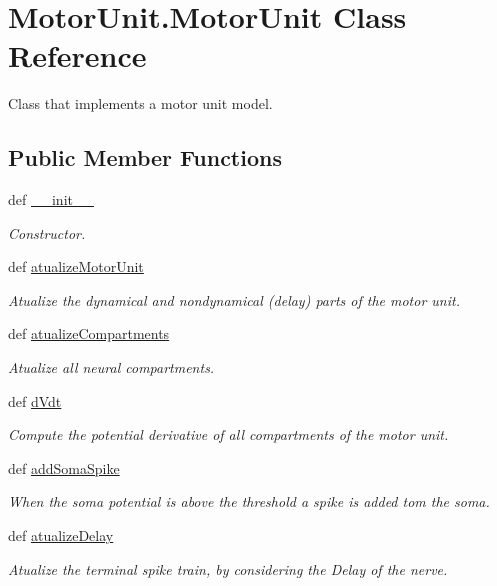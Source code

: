\hypertarget{class_motor_unit_1_1_motor_unit}{\section{Motor\-Unit.\-Motor\-Unit Class Reference}
\label{class_motor_unit_1_1_motor_unit}
}


Class that implements a motor unit model.  


\subsection*{Public Member Functions}
\begin{DoxyCompactItemize}
\item 
def \hyperlink{class_motor_unit_1_1_motor_unit_a5816d9af440be9c847293eff9c7a9f43}{\-\_\-\-\_\-init\-\_\-\-\_\-}
\begin{DoxyCompactList}\small\item\em Constructor. \end{DoxyCompactList}\item 
def \hyperlink{class_motor_unit_1_1_motor_unit_a1239418d3f8428a663ff99061710460f}{atualize\-Motor\-Unit}
\begin{DoxyCompactList}\small\item\em Atualize the dynamical and nondynamical (delay) parts of the motor unit. \end{DoxyCompactList}\item 
def \hyperlink{class_motor_unit_1_1_motor_unit_ae4093022b48cee82d78c99ecc24cb247}{atualize\-Compartments}
\begin{DoxyCompactList}\small\item\em Atualize all neural compartments. \end{DoxyCompactList}\item 
def \hyperlink{class_motor_unit_1_1_motor_unit_af694436ac5bd3194cfcbe42b8a60180d}{d\-Vdt}
\begin{DoxyCompactList}\small\item\em Compute the potential derivative of all compartments of the motor unit. \end{DoxyCompactList}\item 
def \hyperlink{class_motor_unit_1_1_motor_unit_accb8b6700ed06e1396b70af62a9f31c6}{add\-Soma\-Spike}
\begin{DoxyCompactList}\small\item\em When the soma potential is above the threshold a spike is added tom the soma. \end{DoxyCompactList}\item 
def \hyperlink{class_motor_unit_1_1_motor_unit_af9ed66e359c4402ae951d79d5264f566}{atualize\-Delay}
\begin{DoxyCompactList}\small\item\em Atualize the terminal spike train, by considering the Delay of the nerve. \end{DoxyCompactList}\end{DoxyCompactItemize}
